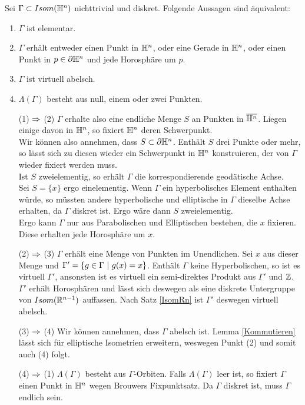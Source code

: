 \documentclass{book}
\begin{document}
\Prop{}
Sei $\Gamma \subset Isom(\mathbb{H}^n)$ nichttrivial und diskret. Folgende Aussagen sind äquivalent:
\begin{enumerate}[(1)]
	\item $\Gamma$ ist elementar.
	\item $\Gamma$ erhält entweder einen Punkt in $\mathbb{H}^n$, oder eine Gerade in $\mathbb{H}^n$, oder einen Punkt in $p \in \partial \mathbb{H}^n$ und jede Horosphäre um $p$.
	\item $\Gamma$ ist virtuell abelsch.
	\item $\Lambda(\Gamma)$ besteht aus null, einem oder zwei Punkten.
\end{enumerate}
\begin{Beweis}{}
	\begin{enumerate}
		\item[(1) $\overset{}{\Rightarrow}$ (2)] $\Gamma$ erhalte also eine endliche Menge $S$ an Punkten in $\overline{\mathbb{H}^n}$. Liegen einige davon in $\mathbb{H}^n$, so fixiert $\mathbb{H}^n$ deren Schwerpunkt.\\
		Wir können also annehmen, dass $S\subset \partial \mathbb{H}^n$. Enthält $S$ drei Punkte oder mehr, so lässt sich zu diesen wieder ein Schwerpunkt in $\mathbb{H}^n$ konstruieren, der von $\Gamma$ wieder fixiert werden muss.\\
		Ist $S$ zweielementig, so erhält $\Gamma$ die korrespondierende geodätische Achse.\\
		Sei $S = \{x\}$ ergo einelementig. Wenn $\Gamma$ ein hyperbolisches Element enthalten würde, so müssten andere hyperbolische und elliptische in $\Gamma$ dieselbe Achse erhalten, da $\Gamma$ diskret ist. Ergo wäre dann $S$ zweielementig.\\
		Ergo kann $\Gamma$ nur aus Parabolischen und Elliptischen bestehen, die $x$ fixieren. Diese erhalten jede Horosphäre um $x$.
		\item[(2) $\overset{}{\Rightarrow}$ (3)] $\Gamma$ erhält eine Menge von Punkten im Unendlichen. Sei $x$ aus dieser Menge und $\Gamma' = \set{g\in \Gamma}{g(x) = x}$. Enthält $\Gamma$ keine Hyperbolischen, so ist es  virtuell $\Gamma'$, ansonsten ist es virtuell ein semi-direktes Produkt aus $\Gamma'$ und $\mathbb{Z}$.\\
		$\Gamma'$ erhält Horosphären und lässt sich deswegen als eine diskrete Untergruppe von $Isom(\mathbb{R}^{n-1})$ auffassen. Nach Satz \ref{IsomRn} ist $\Gamma'$ deswegen virtuell abelsch.
		\item[(3) $\overset{}{\Rightarrow}$ (4)] Wir können annehmen, dass $\Gamma$ abelsch ist. Lemma \ref{Kommutieren} lässt sich für elliptische Isometrien erweitern, weswegen Punkt (2) und somit auch (4) folgt.
		\item[(4) $\overset{}{\Rightarrow}$ (1)] $\Lambda(\Gamma)$ besteht aus $\Gamma$-Orbiten. Falls $\Lambda(\Gamma)$ leer ist, so fixiert $\Gamma$ einen Punkt in $\mathbb{H}^n$ wegen Brouwers Fixpunktsatz. Da $\Gamma$ diskret ist, muss $\Gamma$ endlich sein.
	\end{enumerate}
\end{Beweis}
\end{document}
